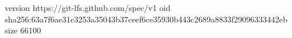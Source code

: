 version https://git-lfs.github.com/spec/v1
oid sha256:63a7f6ae31c3253a35043b37ceef6ce35930b443c2689a8833f29096333442eb
size 66100
